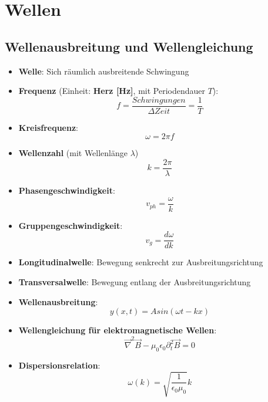 \section{Wellen}%
\label{well:sec:wellen}

\subsection{Wellenausbreitung und Wellengleichung}%
\label{well:sub:wellenausbreitung_und_wellengleichung}

\begin{itemize}
	\item \textbf{Welle}: Sich räumlich ausbreitende Schwingung
	\item \textbf{Frequenz} (Einheit: \textbf{Herz [Hz]}, mit Periodendauer $T$):
	\begin{equation}
		f = \frac{Schwingungen}{\Delta Zeit} = \frac{1}{T}
	\end{equation}
	\item \textbf{Kreisfrequenz}:
	\begin{equation}
		\omega = 2\pi f
	\end{equation}
	\item \textbf{Wellenzahl} (mit Wellenlänge $\lambda$)
	\begin{equation}
		k = \frac{2\pi}{\lambda}
	\end{equation}
	\item \textbf{Phasengeschwindigkeit}:
	\begin{equation}
		v_{ph} = \frac{\omega}{k}
	\end{equation}
	\item \textbf{Gruppengeschwindigkeit}:
	\begin{equation}
		v_g = \frac{d\omega}{dk}
	\end{equation}
	\item \textbf{Longitudinalwelle}: Bewegung senkrecht zur Ausbreitungsrichtung
	\item \textbf{Transversalwelle}: Bewegung entlang der Ausbreitungsrichtung
	\item \textbf{Wellenausbreitung}:
	\begin{equation}
		y(x, t) = Asin(\omega t - kx)
	\end{equation}
	\item \textbf{Wellengleichung für elektromagnetische Wellen}:
	\begin{equation}
		\vec{\nabla}^2\vec{B} - \mu_0\epsilon_0\partial_t^2\vec{B} = 0
	\end{equation}
	\item \textbf{Dispersionsrelation}:
	\begin{equation}
		\omega(k) = \sqrt{\frac{1}{\epsilon_0\mu_0}}k
	\end{equation}
\end{itemize}

